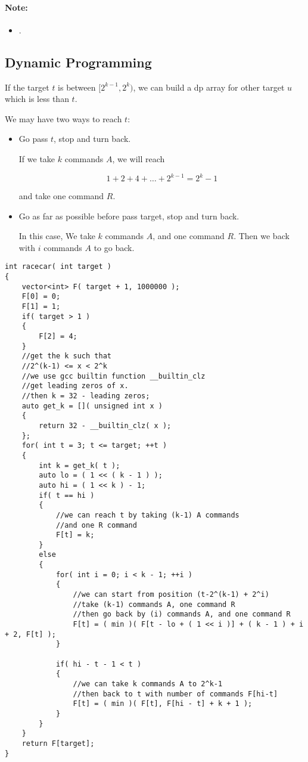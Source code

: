 \paragraph{Note:}

\begin{itemize}
\item {}.
\end{itemize}

\subsection{Dynamic Programming}
If the target $t$ is between $[2^{k-1}, 2^k)$, we can build a dp array for other target $u$ which is less than $t$.

We may have two ways to reach $t$:

\begin{itemize}
\item Go pass $t$, stop and turn back.

If we take $k$ commands $A$, we will reach 

\[
1 + 2 + 4 + \ldots + 2 ^{k-1} = 2^ k -1
\]

and take one command $R$.

\item Go as far as possible before pass target, stop and turn back.

In this case, We take $k$ commands $A$, and one command $R$. Then we back with $i$ commands $A$ to go back.
\end{itemize}

\setcounter{lstlisting}{0}
\begin{lstlisting}[style=customc, caption={DP}]
int racecar( int target )
{
    vector<int> F( target + 1, 1000000 );
    F[0] = 0;
    F[1] = 1;
    if( target > 1 )
    {
        F[2] = 4;
    }
    //get the k such that
    //2^(k-1) <= x < 2^k
    //we use gcc builtin function __builtin_clz
    //get leading zeros of x.
    //then k = 32 - leading zeros;
    auto get_k = []( unsigned int x )
    {
        return 32 - __builtin_clz( x );
    };
    for( int t = 3; t <= target; ++t )
    {
        int k = get_k( t );
        auto lo = ( 1 << ( k - 1 ) );
        auto hi = ( 1 << k ) - 1;
        if( t == hi )
        {
            //we can reach t by taking (k-1) A commands
            //and one R command
            F[t] = k;
        }
        else
        {
            for( int i = 0; i < k - 1; ++i )
            {
                //we can start from position (t-2^(k-1) + 2^i)
                //take (k-1) commands A, one command R
                //then go back by (i) commands A, and one command R
                F[t] = ( min )( F[t - lo + ( 1 << i )] + ( k - 1 ) + i + 2, F[t] );
            }

            if( hi - t - 1 < t )
            {
                //we can take k commands A to 2^k-1
                //then back to t with number of commands F[hi-t]
                F[t] = ( min )( F[t], F[hi - t] + k + 1 );
            }
        }
    }
    return F[target];
}
\end{lstlisting}